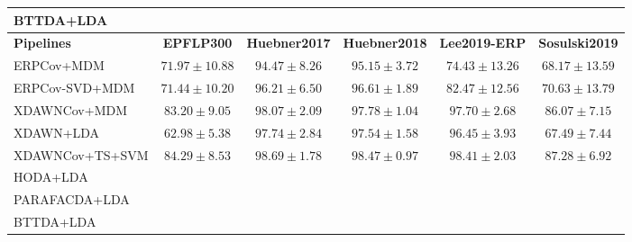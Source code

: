 \begin{tabularx}{\textwidth}{@{}Xccccc@{}}
BTTDA+LDA                 & & & & &  \\
\toprule
\textbf{Pipelines} &  \textbf{EPFLP300} & \textbf{Huebner2017} &
\textbf{Huebner2018} & \textbf{Lee2019-ERP} & \textbf{Sosulski2019} \\
\midrule
ERPCov+MDM            & $71.97\pm10.88$ & $94.47\pm8.26$ & $95.15\pm3.72$ &
$74.43\pm13.26$ & $68.17\pm13.59$ \\
ERPCov-SVD+MDM  & $71.44\pm10.20$ & $96.21\pm6.50$ & $96.61\pm1.89$ &
$82.47\pm12.56$ & $70.63\pm13.79$ \\
XDAWNCov+MDM          & $83.20\pm9.05$ & $98.07\pm2.09$ & $97.78\pm1.04$ &
$97.70\pm2.68$ & $86.07\pm7.15$ \\
XDAWN+LDA             & $62.98\pm5.38$ & $97.74\pm2.84$ & $97.54\pm1.58$ &
$96.45\pm3.93$ & $67.49\pm7.44$ \\
XDAWNCov+TS+SVM       & $84.29\pm8.53$ & $98.69\pm1.78$ & $98.47\pm0.97$ &
$98.41\pm2.03$ & $87.28\pm6.92$ \\ \midrule
HODA+LDA                  & & & & &  \\
PARAFACDA+LDA             & & & & &  \\
BTTDA+LDA                 & & & & &  \\
\bottomrule
\end{tabularx}
